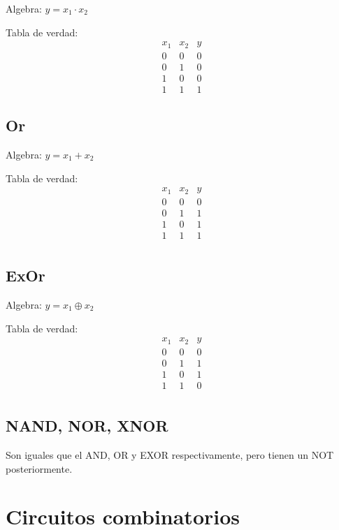 \documentclass{report}
\begin{document}
Algebra: $y=x_1 \cdot x_2$

Tabla de verdad:
$$\begin{array}{cc|c}
		x_1 & x_2 & y \\ \hline
		0   & 0   & 0 \\
		0   & 1   & 0 \\
		1   & 0   & 0 \\
		1   & 1   & 1
	\end{array}$$


\section{Or}

Algebra: $y=x_1 + x_2$

Tabla de verdad:
$$\begin{array}{cc|c}
		x_1 & x_2 & y \\ \hline
		0   & 0   & 0 \\
		0   & 1   & 1 \\
		1   & 0   & 1 \\
		1   & 1   & 1 \\
	\end{array}$$


\section{ExOr}

Algebra: $y=x_1 \oplus x_2$

Tabla de verdad:
$$\begin{array}{cc|c}
		x_1 & x_2 & y \\ \hline
		0   & 0   & 0 \\
		0   & 1   & 1 \\
		1   & 0   & 1 \\
		1   & 1   & 0 \\
	\end{array}$$

\section{NAND, NOR, XNOR}

Son iguales que el AND, OR y EXOR respectivamente, pero tienen un NOT posteriormente.

\chapter{Circuitos combinatorios}
\end{document}
